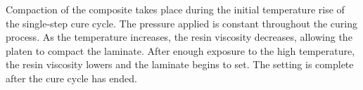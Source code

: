 
Compaction of the composite takes place during the initial temperature rise of the single-step cure cycle. The pressure applied is constant throughout the curing process. As the temperature increases, the resin viscosity decreases, allowing the platen to compact the laminate. After enough exposure to the high temperature, the resin viscosity lowers and the laminate begins to set. The setting is complete after the cure cycle has ended.



